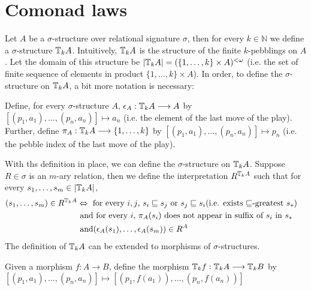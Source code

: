 \section{Comonad laws}
Let $A$ be a $\sigma$-structure over relational signature $\sigma$, then for every $k \in \mathbb{N}$ we define a $\sigma$-structure ${\mathbb{T}_{k}A}$. Intuitively, ${\mathbb{T}_{k}A}$ is the structure of the finite $k$-pebblings on $A$. Let the domain of this structure be $|{\mathbb{T}_{k}A}| = (\{1,\dots,k\} \times A)^{<\omega}$ (i.e. the set of finite sequence of elements in product $\{1,\dots,k\} \times A$). In order, to define the $\sigma$-structure on ${\mathbb{T}_{k}A}$, a bit more notation is necessary:
\begin{defn}
Define, for every $\sigma$-structure $A$, $\epsilon_{A}:{\mathbb{T}_{k}A} \longrightarrow A$ by $[(p_{1},a_{1}),\dots,(p_{n},a_{n})] \mapsto a_{n}$ (i.e. the element of the last move of the play). Further, define $\pi_{A}:{\mathbb{T}_{k}A} \longrightarrow \{1,\dots,k\}$ by $[(p_{1},a_{1}),\dots,(p_{n},a_{n})] \mapsto p_{n}$ (i.e. the pebble index of the last move of the play).
\label{defn:epsilon}
\end{defn}
With ths definition in place, we can define the $\sigma$-structure on ${\mathbb{T}_{k}A}$. Suppose $R \in \sigma$ is an $m$-ary relation, then we define the interpretation $R^{{\mathbb{T}_{k}A}}$ such that for every $s_{1},\dots,s_{m} \in |{\mathbb{T}_{k}A}|$, 
\begin{align}
(s_{1},\dots,s_{m}) \in R^{{\mathbb{T}_{k}A}}  &\Leftrightarrow    \text{ for every $i,j$, } s_{i} \sqsubseteq s_{j} \text{ or } s_{j} \sqsubseteq s_{i} \text{(i.e. exists $\sqsubseteq$-greatest $s_{*}$)} & \label{eq:R1st}\\
&\text{ and for every $i$, } \pi_{A}(s_{i}) \text{ does not appear in suffix of $s_{i}$ in $s_{*}$ } & \label{eq:R2nd} \\
&\text{ and} (\epsilon_{A}(s_{1}),\dots,\epsilon_{A}(s_{m})) \in R^{A} & \label{eq:R3rd}
\end{align}
The definition of ${\mathbb{T}_{k}A}$ can be extended to morphisms of $\sigma$-structures. 
\begin{defn}
Given a morphism $f:A \longrightarrow B$, define the morphism ${\mathbb{T}_{k}f}:{\mathbb{T}_{k}A} \longrightarrow {\mathbb{T}_{k}B}$ by $[(p_{1},a_{1}),\dots,(p_{n},a_{n})] \mapsto [(p_{1},f(a_{1})),\dots,(p_{n},f(a_{n}))]$
\label{defn:comonadMorphism}
\end{defn}
